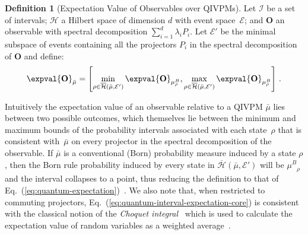 \documentclass[english,reprint, aps, prl,superscriptaddress, showpacs,
showkeys, longbibliography, amsmath, amssymb, floatfix]{revtex4-1}
\theoremstyle{plain}
\theoremstyle{definition}
\newtheorem{definition}{Definition}
\newcommand{\Hilb}{\mathcal{H}}
\newcommand{\events}{\ensuremath{\mathcal{E}}}
\newcommand{\proj}[1]{\op{#1}{#1}}
\newcommand{\ps}{\texttt{+}}
\newcommand{\coreBorn}{\ensuremath{\overline{\Hilb}}}
\newcommand{\muB}{\ensuremath{\mu^{B}}}
\begin{document}
\begin{definition}[Expectation Value of Observables over QIVPMs] Let
  $\mathscr{I}$ be a set of intervals; $\Hilb$ a Hilbert space of
  dimension $d$ with event space~$\events$; and $\mathbf{O}$ an
  observable with spectral decomposition
  $\sum_{i=1}^d \lambda_iP_i$. Let $\events'$ be the minimal
  subspace of events containing all the projectors $P_i$ in the
  spectral decomposition of $\mathbf{O}$ and define:
\begin{equation}
\expval{\mathbf{O}}_{\bar{\mu}}=\left[\min_{\rho\in\coreBorn\left(\bar{\mu},\events'\right)}
\expval{\mathbf{O}}_{\muB_{\rho}},\max_{\rho\in\coreBorn\left(\bar{\mu},\events'\right)}
\expval{\mathbf{O}}_{\muB_{\rho}}\right]\,. \label{eq:quantum-interval-expectation-core}
\end{equation}
\end{definition}

\noindent Intuitively the expectation value of an observable relative
to a QIVPM $\bar{\mu}$ lies between two possible outcomes, which
themselves lie between the minimum and maximum bounds of the
probability intervals associated with each state~$\rho$ that is
consistent with~$\bar{\mu}$ on every projector in the spectral
decomposition of the observable. If $\bar{\mu}$ is a conventional
(Born) probability measure induced by a state $\rho$, then the Born
rule probability induced by every state in
$\coreBorn\left(\bar{\mu},\events'\right)$ will be
$\muB_{\rho}$ and the interval collapses to a point, thus
reducing the definition to that of
Eq.~(\ref{eq:quantum-expectation})~\cite{TaiThesis2018}.
We also note that, when restricted to commuting projectors,
Eq.~(\ref{eq:quantum-interval-expectation-core}) is consistent with
the classical notion of the \emph{Choquet
  integral}~\cite{Choquet1954,GilboaSchmeidler1994,Grabisch2016}
which is used to calculate the expectation value of random variables
as a weighted average~\cite{TaiThesis2018}.
\end{document}

